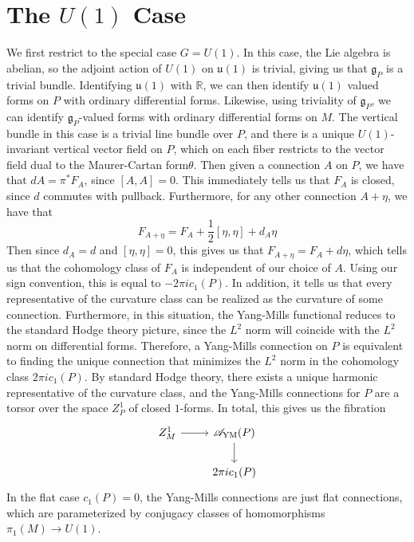 \documentclass[psamsfonts, 12pt]{amsart}
\theoremstyle{definition}
\theoremstyle{remark}
\newcommand{\R}{\mathbb{R}}
\newcommand{\g}{\mathfrak{g}}
\begin{document}
\section{The $U(1)$ Case}
%
We first restrict to the special case $G = U(1)$. In this case, the
Lie algebra is abelian, so the adjoint action of $U(1)$ on $\mathfrak{u}(1)$ is trivial,
giving us that $\g_P$ is a trivial bundle. Identifying $\mathfrak{u}(1)$ with
$\R$, we can then identify $\mathfrak{u}(1)$ valued forms on $P$ with ordinary
differential forms. Likewise, using triviality of $\g_P$, we can identify
$\g_P$-valued forms with ordinary differential forms on $M$. The vertical bundle
in this case is a trivial line bundle over $P$, and there is a unique $U(1)$-invariant
vertical vector field on $P$, which on each fiber restricts to the vector field dual
to the Maurer-Cartan form$\theta$. Then given a connection $A$ on $P$, we have that
$dA = \pi^*F_A$, since $[A,A] = 0$. This immediately tells us that $F_A$ is closed, since $d$
commutes with pullback. Furthermore, for any other connection $A + \eta$, we have that
\[
F_{A+\eta} = F_A + \frac{1}{2}[\eta,\eta] + d_A\eta
\]
Then since $d_A = d$ and $[\eta,\eta] = 0$, this gives us that
$F_{A+\eta} = F_A + d\eta$, which tells us that the cohomology class of $F_A$ is
independent of our choice of $A$. Using our sign convention, this is equal to
$-2\pi i c_1(P)$. In addition, it tells us that every representative
of the curvature class can be realized as the curvature of some connection.
Furthermore, in this situation, the Yang-Mills functional reduces
to the standard Hodge theory picture, since the $L^2$ norm will coincide with the
$L^2$ norm on differential forms. Therefore, a Yang-Mills connection on $P$ is equivalent
to finding the unique connection that minimizes the $L^2$ norm in the cohomology class
$2\pi i c_1(P)$. By standard Hodge theory, there exists a unique harmonic representative of
the curvature class, and the Yang-Mills connections for $P$ are a torsor over the space
$Z^1_P$ of closed $1$-forms. In total, this gives us the fibration
\[\begin{tikzcd}
Z^1_M \ar[r] & \mathscr{A}_{\text{YM}}(P) \ar[d] \\
& 2\pi i c_1(P)
\end{tikzcd}\]
In the flat case $c_1(P) = 0$, the Yang-Mills connections
are just flat connections, which are parameterized by conjugacy classes of homomorphisms
$\pi_1(M) \to U(1)$. \\
\end{document}
